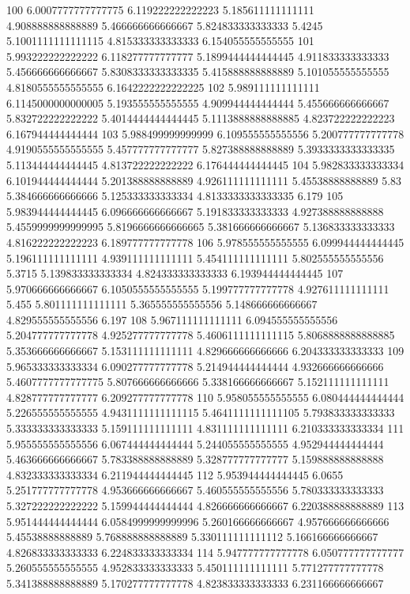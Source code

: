 100 6.0007777777777775 6.119222222222223 5.185611111111111 4.908888888888889 5.466666666666667 5.824833333333333 5.4245 5.1001111111111115 4.815333333333333 6.154055555555555
101 5.993222222222222 6.118277777777777 5.1899444444444445 4.911833333333333 5.456666666666667 5.8308333333333335 5.415888888888889 5.101055555555555 4.8180555555555555 6.1642222222222225
102 5.989111111111111 6.1145000000000005 5.193555555555555 4.909944444444444 5.455666666666667 5.832722222222222 5.4014444444444445 5.1113888888888885 4.823722222222223 6.167944444444444
103 5.988499999999999 6.109555555555556 5.200777777777778 4.9190555555555555 5.457777777777777 5.827388888888889 5.3933333333333335 5.113444444444445 4.813722222222222 6.176444444444445
104 5.982833333333334 6.101944444444444 5.201388888888889 4.926111111111111 5.45538888888889 5.83 5.384666666666666 5.125333333333334 4.8133333333333335 6.179
105 5.983944444444445 6.096666666666667 5.191833333333333 4.927388888888888 5.4559999999999995 5.8196666666666665 5.381666666666667 5.136833333333333 4.816222222222223 6.189777777777778
106 5.978555555555555 6.099944444444445 5.196111111111111 4.939111111111111 5.454111111111111 5.802555555555556 5.3715 5.139833333333334 4.824333333333333 6.193944444444445
107 5.970666666666667 6.1050555555555555 5.199777777777778 4.927611111111111 5.455 5.801111111111111 5.365555555555556 5.148666666666667 4.829555555555556 6.197
108 5.967111111111111 6.094555555555556 5.204777777777778 4.925277777777778 5.4606111111111115 5.8068888888888885 5.353666666666667 5.153111111111111 4.829666666666666 6.204333333333333
109 5.965333333333334 6.090277777777778 5.214944444444444 4.932666666666666 5.4607777777777775 5.807666666666666 5.338166666666667 5.152111111111111 4.828777777777777 6.209277777777778
110 5.958055555555555 6.080444444444444 5.226555555555555 4.9431111111111115 5.4641111111111105 5.793833333333333 5.333333333333333 5.159111111111111 4.831111111111111 6.210333333333334
111 5.955555555555556 6.067444444444444 5.244055555555555 4.952944444444444 5.463666666666667 5.783388888888889 5.328777777777777 5.159888888888888 4.832333333333334 6.211944444444445
112 5.953944444444445 6.0655 5.251777777777778 4.953666666666667 5.460555555555556 5.780333333333333 5.327222222222222 5.159944444444444 4.826666666666667 6.220388888888889
113 5.951444444444444 6.0584999999999996 5.260166666666667 4.957666666666666 5.45538888888889 5.768888888888889 5.330111111111112 5.166166666666667 4.826833333333333 6.224833333333334
114 5.947777777777778 6.050777777777777 5.260555555555555 4.952833333333333 5.450111111111111 5.771277777777778 5.341388888888889 5.170277777777778 4.823833333333333 6.231166666666667
